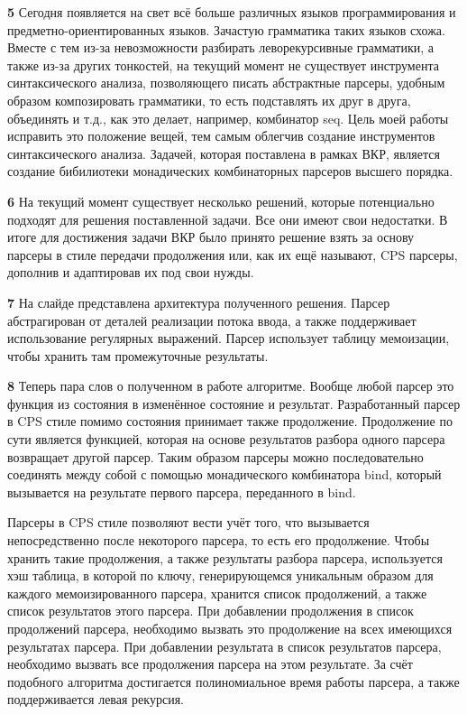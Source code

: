 \documentclass[times]{itmo-student-thesis}
\begin{document}
\textbf{5} Сегодня появляется на свет всё больше различных языков программирования и
предметно-ориентированных языков. Зачастую грамматика таких языков схожа. Вместе с тем из-за невозможности разбирать
леворекурсивные грамматики, а также из-за других тонкостей, на текущий момент не существует инструмента синтаксического
анализа, позволяющего писать абстрактные парсеры, удобным образом композировать грамматики, то есть подставлять их друг
в друга, объединять и т.д., как это делает, например, комбинатор seq. Цель моей работы исправить это положение вещей,
тем самым облегчив создание инструментов синтаксического анализа.  Задачей, которая поставлена в рамках ВКР, является
создание бибилиотеки монадических комбинаторных парсеров высшего порядка.

\textbf{6} На текущий момент существует несколько решений, которые потенциально подходят для решения поставленной задачи. Все
они имеют свои недостатки. В итоге для достижения задачи ВКР было принято решение взять за основу парсеры в стиле
передачи продолжения или, как их ещё называют, CPS парсеры, дополнив и адаптировав их под свои нужды.

\textbf{7} На слайде представлена архитектура полученного решения. Парсер абстрагирован от деталей реализации потока ввода,
а также поддерживает использование регулярных выражений. Парсер использует таблицу мемоизации, чтобы хранить там 
промежуточные результаты.

\textbf{8} Теперь пара слов о полученном в работе алгоритме. Вообще любой парсер это функция из состояния в изменённое 
состояние и результат.	Разработанный парсер в CPS стиле помимо состояния принимает также продолжение. Продолжение по
сути является функцией, которая на основе результатов разбора одного парсера возвращает другой парсер. Таким образом
парсеры можно последовательно соединять между собой с помощью монадического комбинатора bind, который вызывается на
результате первого парсера, переданного в bind.

Парсеры в CPS стиле позволяют вести учёт того, что вызывается непосредственно после некоторого парсера, то есть его продолжение. Чтобы хранить
такие продолжения, а также результаты разбора парсера, используется хэш таблица, в которой по ключу, генерирующемся 
уникальным образом для каждого мемоизированного парсера, хранится список продолжений, а также список
результатов этого парсера. При добавлении продолжения в список продолжений парсера, необходимо вызвать это продолжение
на всех имеющихся результатах парсера. При добавлении результата в список результатов парсера, необходимо вызвать все
продолжения парсера на этом результате. За счёт подобного алгоритма достигается полиномиальное время работы парсера, а
также поддерживается левая рекурсия.
\end{document}
